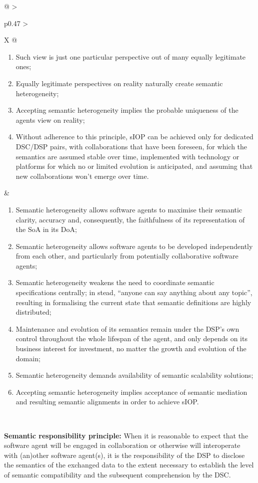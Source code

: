 \begin{xltabular}[l]{\linewidth}{@{} >{\small\raggedright\arraybackslash}p{0.47\linewidth} >{\small\raggedright\arraybackslash}X @{}}
\begin{enumerate}[left=6pt, nosep]
  \item Such view is just one particular perspective out of many equally legitimate ones;
  \item Equally legitimate perspectives on reality naturally create semantic heterogeneity;
  \item Accepting semantic heterogeneity implies the probable uniqueness of the agents view on reality;
  \item Without adherence to this principle, sIOP can be achieved only for dedicated DSC/DSP pairs, with collaborations that have been foreseen, for which the semantics are assumed stable over time, implemented with technology or platforms for which no or limited evolution is anticipated, and assuming that new collaborations won't emerge over time.
\end{enumerate}
&
\begin{enumerate}[left=10pt, nosep]
  \item Semantic heterogeneity allows software agents to maximise their semantic clarity, accuracy and, consequently, the faithfulness of its representation of the SoA in its DoA;
  \item Semantic heterogeneity allows software agents to be developed independently from each other, and particularly from potentially collaborative software agents;
  \item Semantic heterogeneity weakens the need to coordinate semantic specifications centrally; in stead, “anyone can say anything about any topic”, resulting in formalising the current state that semantic definitions are highly distributed;
  \item Maintenance and evolution of its semantics remain under the DSP’s own control throughout the whole lifespan of the agent, and only depends on its business interest for investment, no matter the growth and evolution of the domain;
  \item Semantic heterogeneity demands availability of semantic scalability solutions;
  \item Accepting semantic heterogeneity implies acceptance of semantic mediation and resulting semantic alignments in order to achieve sIOP.
\end{enumerate} \\
%
%
%
\begin{mmdp}\label{dp:srp}{\bfseries Semantic responsibility principle:}
\quad When it is reasonable to expect that the software agent will be engaged in collaboration or otherwise will interoperate with (an)other software agent(s), it is the responsibility of the DSP to disclose the semantics of the exchanged data to the extent necessary to establish the level of semantic compatibility and the subsequent comprehension by the DSC. 

\end{mmdp}
\end{xltabular}
